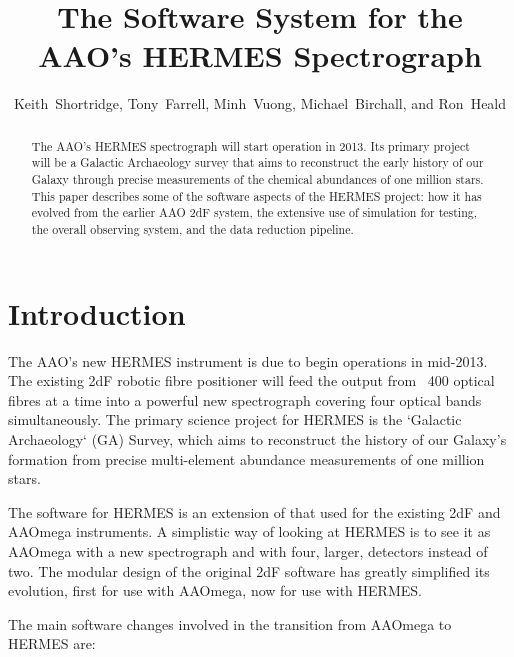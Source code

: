 
\resetcounters





\title{The Software System for the AAO's HERMES Spectrograph}
\author{Keith~Shortridge, Tony~Farrell, Minh~Vuong, Michael~Birchall, and Ron~Heald
}


\begin{abstract}
The AAO's HERMES spectrograph will start operation in 2013. Its primary project will be a Galactic Archaeology survey that aims to reconstruct the early history of our Galaxy through precise measurements of the chemical abundances of one million stars. This paper describes some of the software aspects of the HERMES project: how it has evolved from the earlier AAO 2dF system, the extensive use of simulation for testing, the overall observing system, and the data reduction pipeline.
\end{abstract}

\section{Introduction}

The AAO's new HERMES instrument \citep{Hermes_2010} is due to begin operations in mid-2013. The existing 2dF robotic fibre positioner will feed the output from ~400 optical fibres at a time into a powerful new spectrograph covering four optical bands simultaneously. The primary science project for HERMES is the ‘Galactic Archaeology‘ (GA) Survey, which aims to reconstruct the history of our Galaxy's formation from precise multi-element abundance measurements of one million stars.

The software for HERMES is an extension of that used for the existing 2dF and AAOmega instruments. A simplistic way of looking at HERMES is to see it as AAOmega with a new spectrograph and with four, larger, detectors instead of two. The modular design of the original 2dF software has greatly simplified its evolution, first for use with AAOmega, now for use with HERMES.

The main software changes involved in the transition from AAOmega to HERMES are:

